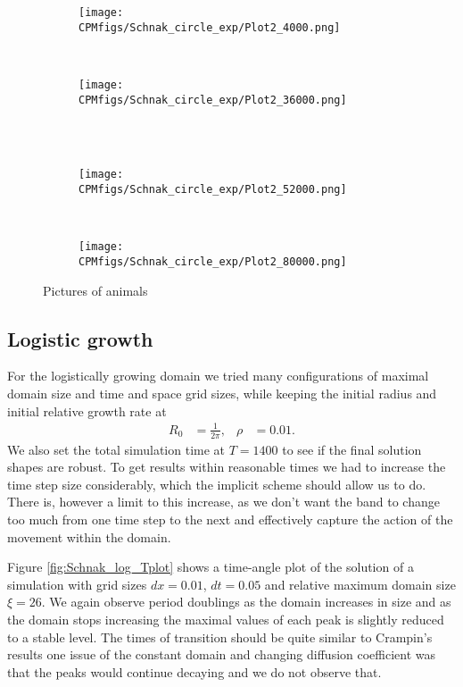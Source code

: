 \documentclass[fleqn,12pt]{siamart1116}
\begin{document}
\begin{figure}
    \centering
    \begin{subfigure}[b]{0.45\textwidth}
        \texttt{[image: CPMfigs/Schnak\_circle\_exp/Plot2\_4000.png]}
        \label{fig:Schnak_exp_2-1}
    \end{subfigure}
    ~ %
    \begin{subfigure}[b]{0.45\textwidth}
        \texttt{[image: CPMfigs/Schnak\_circle\_exp/Plot2\_36000.png]}
        \label{fig:Schnak_exp_2-2}
    \end{subfigure}
		\\
    ~ %
    \begin{subfigure}[b]{0.45\textwidth}
        \texttt{[image: CPMfigs/Schnak\_circle\_exp/Plot2\_52000.png]}
        \label{fig:Schnak_exp_2-3}
    \end{subfigure}
		~
		\begin{subfigure}[b]{0.45\textwidth}
        \texttt{[image: CPMfigs/Schnak\_circle\_exp/Plot2\_80000.png]}
        \label{fig:Schnak_exp_2-4}
    \end{subfigure}
    \caption{Pictures of animals}\label{fig:Schnak_exp_2}
\end{figure}

\subsection{Logistic growth}
For the logistically growing domain we tried many configurations of maximal domain size and time and space grid sizes, while keeping the initial radius and initial relative growth rate at
\begin{align}
R_0 &= \frac{1}{2\pi}, & \rho &= 0.01.
\end{align}
We also set the total simulation time at $T = 1400$ to see if the final solution shapes are robust. To get results within reasonable times we had to increase the time step size considerably, which the implicit scheme should allow us to do. There is, however a limit to this increase, as we don't want the band to change too much from one time step to the next and effectively capture the action of the movement within the domain.

Figure \ref{fig:Schnak_log_Tplot} shows a time-angle plot of the solution of a simulation with grid sizes $dx = 0.01$, $dt = 0.05$ and relative maximum domain size $\xi = 26$. We again observe period doublings as the domain increases in size and as the domain stops increasing the maximal values of each peak is slightly reduced to a stable level. The times of transition should be quite similar to Crampin's results one issue of the constant domain and changing diffusion coefficient was that the peaks would continue decaying and we do not observe that.
\end{document}
